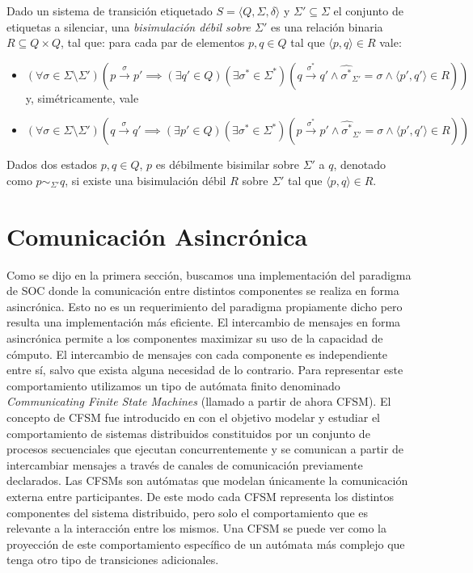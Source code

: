 \begin{definition} Dado un sistema de transición etiquetado $ S = \langle Q, \Sigma, \delta \rangle $ y $\Sigma' \subseteq \Sigma$ el conjunto de etiquetas a silenciar, una \emph{bisimulación débil sobre $\Sigma'$} es una relación binaria $R \subseteq Q \times Q$, tal que: para cada par de elementos $p, q \in Q$ tal que $\langle p, q \rangle \in R$ vale:
\begin{itemize}
    \item $(\forall \sigma \in \Sigma \setminus \Sigma')(p \xrightarrow{\sigma} p' \implies (\exists q' \in Q)(\exists \sigma^* \in \Sigma^*)(q \xrightarrow{\sigma^*} q' \land \widehat{\sigma^*}_{\Sigma'} = \sigma \land \langle p', q' \rangle \in R))$ y, simétricamente, vale 
    \item $(\forall \sigma \in \Sigma \setminus \Sigma')(q \xrightarrow{\sigma} q' \implies (\exists p' \in Q)(\exists \sigma^* \in \Sigma^*)(p \xrightarrow{\sigma^*} p' \land \widehat{\sigma^*}_{\Sigma'} = \sigma \land \langle p', q' \rangle \in R))$
\end{itemize}
Dados dos estados $p, q \in Q $, $p$ es débilmente bisimilar sobre $\Sigma'$ a $q$, denotado como $p \sim_{\Sigma'} q$, si existe una bisimulación débil $R$ sobre $\Sigma'$ tal que $\langle p, q \rangle \in R$.
\end{definition}


\section*{Comunicación Asincrónica}
Como se dijo en la primera sección, buscamos una implementación del paradigma de SOC donde la comunicación entre distintos componentes se realiza en forma asincrónica. Esto no es un requerimiento del paradigma propiamente dicho pero resulta una implementación más eficiente. El intercambio de mensajes en forma asincrónica permite a los componentes maximizar su uso de la capacidad de cómputo.  El intercambio de mensajes con cada componente es independiente entre sí, salvo que exista alguna necesidad de lo contrario. Para representar este comportamiento utilizamos un tipo de autómata finito denominado \emph{Communicating Finite State Machines} (llamado a partir de ahora CFSM). El concepto de CFSM fue introducido en \cite{brand:jacm-30_2} con el objetivo modelar y estudiar el comportamiento de sistemas distribuidos constituidos por un conjunto de procesos secuenciales que ejecutan concurrentemente y se comunican a partir de intercambiar mensajes a través de canales de comunicación previamente declarados. Las CFSMs son autómatas que modelan únicamente la comunicación externa entre participantes. De este modo cada CFSM representa los distintos componentes del sistema distribuido, pero solo el comportamiento que es relevante a la interacción entre los mismos. Una CFSM se puede ver como la proyección de este comportamiento específico de un autómata más complejo que tenga otro tipo de transiciones adicionales.

